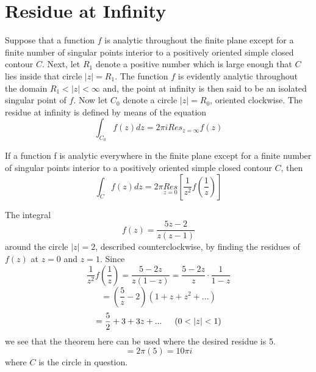 \section{Residue at Infinity}
Suppose that a function $ f $ is analytic throughout the finite plane except for a finite number of singular points interior to a positively oriented simple closed contour $ C $. Next, let $ R_1 $ denote a positive number which is large enough that $ C $ lies inside that circle $ |z| = R_1 $. The function $ f $ is evidently analytic throughout the domain $ R_1 < |z| < \infty $ and, the point at infinity is then said to be an isolated singular point of $ f $.  	
  Now let $ C_0 $ denote a circle $ |z| = R_0 $, oriented clockwise. The residue at infinity is defined by means of the equation \[ \int_{C_0} f(z) dz = 2 \pi i Res_{z=\infty} f(z) \]
\begin{theorem}
If a function f is analytic everywhere in the finite plane except for a finite number of singular points interior to a positively oriented simple closed contour $ C $, then
\[ \int_C f(z) dz = 2 \pi \underset{z =0}{Res} \left[ \dfrac{1}{z^2} f \left(\dfrac{1}{z}\right)  \right] \]
\end{theorem}
\begin{example}
	The integral \[ f(z) = \dfrac{5z - 2}{z(z-1)} \] around the circle $ |z| = 2 $, described counterclockwise, by finding the residues of $ f(z) $ at $ z = 0  $ and $ z = 1 $. Since 
	\[ \dfrac{1}{z^2} f\left( \dfrac{1}{z} \right)  = \dfrac{5 -2z}{z(1-z)} = \dfrac{5 -2z}{z} \cdot \dfrac{1}{1-z}   \] 
	\[ = \left( \dfrac{5}{z} - 2 \right) (1 + z + z^2 + ...) \] 
	\[ = \dfrac{5}{2} + 3 + 3z + ... \indent (0 < |z| < 1)\] we see that the theorem here can be used where the desired residue is 5. 
	\[ = 2 \pi (5) = 10 \pi i \] where $ C $ is the circle in question.
\end{example}
